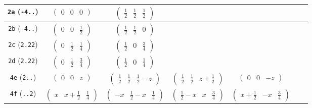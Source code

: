 \documentclass[fleqn,9pt,landscape]{jsarticle}
\begin{document}
\begin{center}
\begin{longtable}{ccccccc}
{\tt 2a} ({\tt -4..}) & $ \begin{pmatrix} 0 & 0 & 0 \end{pmatrix} $ & $ \begin{pmatrix} \frac{1}{2} & \frac{1}{2} & \frac{1}{2} \end{pmatrix} $ & $  $ & $  $ & $  $ & $  $ \\ \hline
{\tt 2b} ({\tt -4..}) & $ \begin{pmatrix} 0 & 0 & \frac{1}{2} \end{pmatrix} $ & $ \begin{pmatrix} \frac{1}{2} & \frac{1}{2} & 0 \end{pmatrix} $ & $  $ & $  $ & $  $ & $  $ \\ \hline
{\tt 2c} ({\tt 2.22}) & $ \begin{pmatrix} 0 & \frac{1}{2} & \frac{1}{4} \end{pmatrix} $ & $ \begin{pmatrix} \frac{1}{2} & 0 & \frac{3}{4} \end{pmatrix} $ & $  $ & $  $ & $  $ & $  $ \\ \hline
{\tt 2d} ({\tt 2.22}) & $ \begin{pmatrix} 0 & \frac{1}{2} & \frac{3}{4} \end{pmatrix} $ & $ \begin{pmatrix} \frac{1}{2} & 0 & \frac{1}{4} \end{pmatrix} $ & $  $ & $  $ & $  $ & $  $ \\ \hline
{\tt 4e} ({\tt 2..}) & $ \begin{pmatrix} 0 & 0 & z \end{pmatrix} $ & $ \begin{pmatrix} \frac{1}{2} & \frac{1}{2} & \frac{1}{2} - z \end{pmatrix} $ & $ \begin{pmatrix} \frac{1}{2} & \frac{1}{2} & z + \frac{1}{2} \end{pmatrix} $ & $ \begin{pmatrix} 0 & 0 & - z \end{pmatrix} $ & $  $ & $  $ \\ \hline
{\tt 4f} ({\tt ..2}) & $ \begin{pmatrix} x & x + \frac{1}{2} & \frac{1}{4} \end{pmatrix} $ & $ \begin{pmatrix} - x & \frac{1}{2} - x & \frac{1}{4} \end{pmatrix} $ & $ \begin{pmatrix} \frac{1}{2} - x & x & \frac{3}{4} \end{pmatrix} $ & $ \begin{pmatrix} x + \frac{1}{2} & - x & \frac{3}{4} \end{pmatrix} $ & $  $ & $  $ \\ \hline

\end{longtable}
\end{center}
\end{document}
